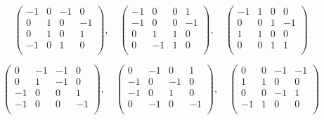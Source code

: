 \documentclass[12pt]{article}
\begin{document}
\begin{equation}
\left(
\begin{array}{cccc}
 -1 & 0 & -1 & 0 \\
 0 & 1 & 0 & -1 \\
 0 & 1 & 0 & 1 \\
 -1 & 0 & 1 & 0 \\
\end{array}
\right)
,\quad
\left(
\begin{array}{cccc}
 -1 & 0 & 0 & 1 \\
 -1 & 0 & 0 & -1 \\
 0 & 1 & 1 & 0 \\
 0 & -1 & 1 & 0 \\
\end{array}
\right)
,\quad
\left(
\begin{array}{cccc}
 -1 & 1 & 0 & 0 \\
 0 & 0 & 1 & -1 \\
 1 & 1 & 0 & 0 \\
 0 & 0 & 1 & 1 \\
\end{array}
\right)
\end{equation}

\begin{equation}
\left(
\begin{array}{cccc}
 0 & -1 & -1 & 0 \\
 0 & 1 & -1 & 0 \\
 -1 & 0 & 0 & 1 \\
 -1 & 0 & 0 & -1 \\
\end{array}
\right)
,\quad
\left(
\begin{array}{cccc}
 0 & -1 & 0 & 1 \\
 -1 & 0 & -1 & 0 \\
 -1 & 0 & 1 & 0 \\
 0 & -1 & 0 & -1 \\
\end{array}
\right)
,\quad
\left(
\begin{array}{cccc}
 0 & 0 & -1 & -1 \\
 1 & 1 & 0 & 0 \\
 0 & 0 & -1 & 1 \\
 -1 & 1 & 0 & 0 \\
\end{array}
\right)
\end{equation}
\end{document}
